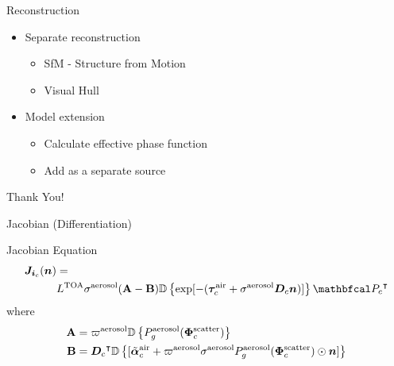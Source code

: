 \documentclass[compress,red,12pt]{beamer}
\begin{document}
%
%
\begin{frame}{Reconstruction}

  \begin{itemize}
  \item Separate reconstruction
    \begin{itemize}
    \item SfM - Structure from Motion 
    \item Visual Hull
    \end{itemize}

  \item Model extension
    \begin{itemize}
    \item Calculate effective phase function
    \item Add as a separate source
    \end{itemize}
  \end{itemize}

\end{frame}


\begin{frame}{}
\end{frame}


\begin{frame}{}
  \begin{center}
    {\huge Thank You!}
  \end{center}
\end{frame}


\appendix

\begin{frame}[label=jacobian]{Jacobian (Differentiation)}
  \begin{block}{Jacobian Equation}
    \begin{align*}
      {\bm J}_{{\bm i}_c}({\bm n}) &= \\
      &L^{\rm TOA}{\sigma}^{\rm
        aerosol}({\bf A}-{\bf B}) \OpDiag{\exp[-(\vect{\tau}_c^{\rm air} +
        {\sigma}^{\rm aerosol} {\bm D}_c {\bm n})]}
      \transpose{\OpCamera_c}
    \end{align*}
    where
    \begin{align*}
      {\bf A} &= \varpi^{\rm aerosol}
      \mathbb{D}\left\{ P_g^{\rm aerosol}(\bm{\Phi}^{\rm scatter}_c)\right\} \\
      {\bf B} &= {{\bm D}_c}^\intercal
      \mathbb{D}\left\{[\tilde{\bm{\alpha}}^{\rm air}_c + \varpi^{\rm
          aerosol}\sigma^{\rm aerosol} P^{\rm aerosol}_g(\bm{\Phi}^{\rm
          scatter}_c) \odot{\bm n}    ]\right\}
    \end{align*}
  \end{block}
  \hfill\hyperlink{gradient}{}
\end{frame}
\end{document}
